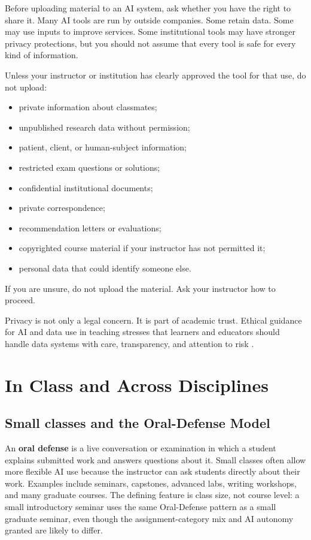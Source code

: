 \documentclass{SIAMbook2023}
\newcommand{\keyterm}[2][\relax]{%
  \textbf{#2}%
  \ifx\relax#1\index{#2|textbf}\else\index{#1|textbf}\fi}
\begin{document}
Before uploading material to an AI system, ask whether you have the right to share it. Many AI tools are run by outside companies. Some retain data. Some may use inputs to improve services. Some institutional tools may have stronger privacy protections, but you should not assume that every tool is safe for every kind of information.

Unless your instructor or institution has clearly approved the tool for that use, do not upload:

\begin{itemize}
\item private information about classmates;
\item unpublished research data without permission;
\item patient, client, or human-subject information;
\item restricted exam questions or solutions;
\item confidential institutional documents;
\item private correspondence;
\item recommendation letters or evaluations;
\item copyrighted course material if your instructor has not permitted it;
\item personal data that could identify someone else.
\end{itemize}

If you are unsure, do not upload the material. Ask your instructor how to proceed.

Privacy is not only a legal concern. It is part of academic trust. Ethical guidance for AI and data use in teaching stresses that learners and educators should handle data systems with care, transparency, and attention to risk \citep{europeancommission2022ethical}.

\chapter{In Class and Across Disciplines}
\label{ch:in-class-and-across-disciplines}%

\section{Small classes and the Oral-Defense Model}
\label{sec:small-classes}%

An \keyterm{oral defense} is a live conversation or examination in which a student explains submitted work and answers questions about it. Small classes often allow more flexible AI use because the instructor can ask students directly about their work. Examples include seminars, capstones, advanced labs, writing workshops, and many graduate courses. The defining feature is class size, not course level: a small introductory seminar uses the same Oral-Defense pattern as a small graduate seminar, even though the assignment-category mix and AI autonomy granted are likely to differ.
\end{document}
